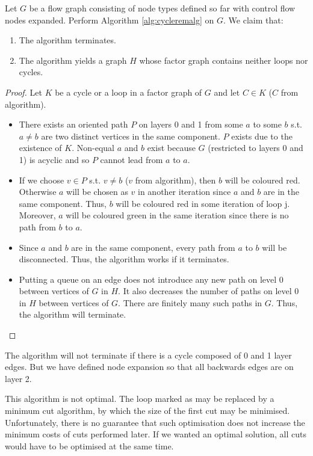   Let $G$ be a flow graph consisting of node types defined so far with control flow nodes expanded. Perform Algorithm \ref{alg:cycleremalg} on $G$. We claim that:
  \begin{enumerate}
    \item The algorithm terminates.
    \item The algorithm yields a graph $H$ whose factor graph contains neither loops nor cycles.
  \end{enumerate}
  \begin{proof}
    Let $K$ be a cycle or a loop in a factor graph of $G$ and let $C \in K$ ($C$ from algorithm).
    \begin{itemize}
      \item There exists an oriented path $P$ on layers 0 and 1 from some $a$ to some $b$ s.t. $a \neq b$ are two distinct vertices in the same component. $P$ exists due to the existence of $K$. Non-equal $a$ and $b$ exist because $G$ (restricted to layers 0 and 1) is acyclic and so $P$ cannot lead from $a$ to $a$. 
      \item If we choose $v \in P$ s.t. $v \neq b$ ($v$ from algorithm), then $b$ will be coloured red. Otherwise $a$ will be chosen as $v$ in another iteration since $a$ and $b$ are in the same component. Thus, $b$ will be coloured red in some iteration of loop j.  Moreover, $a$ will be coloured green in the same iteration since there is no path from $b$ to $a$.
      \item Since $a$ and $b$ are in the same component, every path from $a$ to $b$ will be disconnected. Thus, the algorithm works if it terminates. 
  \item Putting a queue on an edge does not introduce any new path on level 0 between vertices of $G$ in $H$. It also decreases the number of paths on level 0 in $H$ between vertices of $G$. There are finitely many such paths in $G$. Thus, the algorithm will terminate.
    \end{itemize}
  \end{proof}
\myendclaim

\begin{rem}
  The algorithm will not terminate if there is a cycle composed of 0 and 1 layer edges. But we have defined node expansion so that all backwards edges are on layer 2.
\end{rem}

This algorithm is not optimal. The loop marked as  may be replaced by a minimum cut algorithm, by which the size of the first cut may be minimised. Unfortunately, there is no guarantee that such optimisation does not increase the minimum costs of cuts performed later. If we wanted an optimal solution, all cuts would have to be optimised at the same time. 


